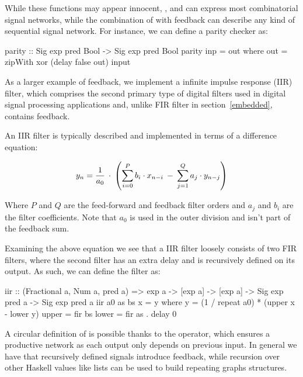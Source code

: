 \documentclass[../paper.tex]{subfiles}
\begin{document}
While these functions may appear innocent, ,  and  can express most combinatorial signal networks, while the combination of  with feedback can describe any kind of sequential signal network. For instance, we can define a parity checker as:

\begin{code}
parity :: Sig exp pred Bool -> Sig exp pred Bool
parity inp = out where
  out = zipWith xor (delay false out) input
\end{code}

As a larger example of feedback, we implement a infinite impulse response (IIR) filter, which comprises the second primary type of digital filters used in digital signal processing applications and, unlike FIR filter in section~\ref{embedded}, contains feedback.

An IIR filter is typically described and implemented in terms of a difference equation:

\begin{equation}
y_{n} = {1 \over a_{0}} \: \cdot \: \left( \sum_{i=0}^{P} b_{i} \cdot x_{n-i} \: - \: \sum_{j=1}^{Q} a_{j} \cdot y_{n-j} \right)
\end{equation}
\vspace{1mm}

\noindent Where $P$ and $Q$ are the feed-forward and feedback filter orders and $a_{j}$ and $b_{i}$ are the filter coefficients. Note that $a_{0}$ is used in the outer division and isn't part of the feedback sum.

Examining the above equation we see that a IIR filter loosely consists of two FIR filters, where the second filter has an extra delay and is recursively defined on its output. As such, we can define the filter as:

\begin{code}
iir :: (Fractional a, Num a, pred a) => exp a -> [exp a] -> [exp a]
  -> Sig exp pred a -> Sig exp pred a
iir a0 as bs x = y
  where
    y = (1 / repeat a0) * (upper x - lower y)
    upper = fir bs
    lower = fir as . delay 0
\end{code}

A circular definition of  is possible thanks to the  operator, which ensures a productive network as each output only depends on previous input. In general we have that recursively defined signals introduce feedback, while recursion over other Haskell values like lists can be used to build repeating graphs structures.
\end{document}
